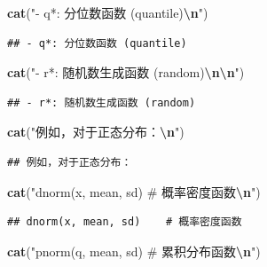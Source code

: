 \documentclass[
]{book}
\newenvironment{Shaded}{\begin{snugshade}}{\end{snugshade}}
\newcommand{\FunctionTok}[1]{\textcolor[rgb]{0.13,0.29,0.53}{\textbf{#1}}}
\newcommand{\NormalTok}[1]{#1}
\newcommand{\SpecialCharTok}[1]{\textcolor[rgb]{0.81,0.36,0.00}{\textbf{#1}}}
\newcommand{\StringTok}[1]{\textcolor[rgb]{0.31,0.60,0.02}{#1}}
\begin{document}
\begin{Shaded}
\begin{Highlighting}[]
\FunctionTok{cat}\NormalTok{(}\StringTok{"{-} q*: 分位数函数 (quantile)}\SpecialCharTok{\textbackslash{}n}\StringTok{"}\NormalTok{)}
\end{Highlighting}
\end{Shaded}

\begin{verbatim}
## - q*: 分位数函数 (quantile)
\end{verbatim}

\begin{Shaded}
\begin{Highlighting}[]
\FunctionTok{cat}\NormalTok{(}\StringTok{"{-} r*: 随机数生成函数 (random)}\SpecialCharTok{\textbackslash{}n\textbackslash{}n}\StringTok{"}\NormalTok{)}
\end{Highlighting}
\end{Shaded}

\begin{verbatim}
## - r*: 随机数生成函数 (random)
\end{verbatim}

\begin{Shaded}
\begin{Highlighting}[]
\FunctionTok{cat}\NormalTok{(}\StringTok{"例如，对于正态分布：}\SpecialCharTok{\textbackslash{}n}\StringTok{"}\NormalTok{)}
\end{Highlighting}
\end{Shaded}

\begin{verbatim}
## 例如，对于正态分布：
\end{verbatim}

\begin{Shaded}
\begin{Highlighting}[]
\FunctionTok{cat}\NormalTok{(}\StringTok{"dnorm(x, mean, sd)    \# 概率密度函数}\SpecialCharTok{\textbackslash{}n}\StringTok{"}\NormalTok{)}
\end{Highlighting}
\end{Shaded}

\begin{verbatim}
## dnorm(x, mean, sd)    # 概率密度函数
\end{verbatim}

\begin{Shaded}
\begin{Highlighting}[]
\FunctionTok{cat}\NormalTok{(}\StringTok{"pnorm(q, mean, sd)    \# 累积分布函数}\SpecialCharTok{\textbackslash{}n}\StringTok{"}\NormalTok{)}
\end{Highlighting}
\end{Shaded}
\end{document}
